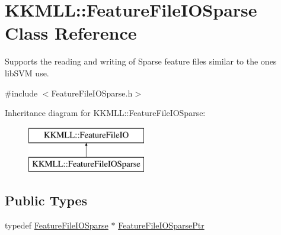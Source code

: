 \hypertarget{class_k_k_m_l_l_1_1_feature_file_i_o_sparse}{}\section{K\+K\+M\+LL\+:\+:Feature\+File\+I\+O\+Sparse Class Reference}
\label{class_k_k_m_l_l_1_1_feature_file_i_o_sparse}


Supports the reading and writing of Sparse feature files similar to the ones lib\+S\+VM use.  




{\ttfamily \#include $<$Feature\+File\+I\+O\+Sparse.\+h$>$}

Inheritance diagram for K\+K\+M\+LL\+:\+:Feature\+File\+I\+O\+Sparse\+:\begin{figure}[H]
\begin{center}
\leavevmode
\includegraphics[height=2.000000cm]{class_k_k_m_l_l_1_1_feature_file_i_o_sparse}
\end{center}
\end{figure}
\subsection*{Public Types}
\begin{DoxyCompactItemize}
\item 
typedef \hyperlink{class_k_k_m_l_l_1_1_feature_file_i_o_sparse}{Feature\+File\+I\+O\+Sparse} $\ast$ \hyperlink{class_k_k_m_l_l_1_1_feature_file_i_o_sparse_ae523542dd0794ca562fa18b9db490f29}{Feature\+File\+I\+O\+Sparse\+Ptr}
\end{DoxyCompactItemize}
